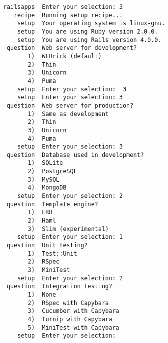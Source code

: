 \documentclass[bidi]{tufte-handout}
\begin{document}
\begin{verbatim}
   railsapps  Enter your selection: 3
      recipe  Running setup recipe...
       setup  Your operating system is linux-gnu.
       setup  You are using Ruby version 2.0.0.
       setup  You are using Rails version 4.0.0.
    question  Web server for development?
          1)  WEBrick (default)
          2)  Thin
          3)  Unicorn
          4)  Puma
       setup  Enter your selection:  3
       setup  Enter your selection: 3
    question  Web server for production?
          1)  Same as development
          2)  Thin
          3)  Unicorn
          4)  Puma
       setup  Enter your selection: 3
    question  Database used in development?
          1)  SQLite
          2)  PostgreSQL
          3)  MySQL
          4)  MongoDB
       setup  Enter your selection: 2
    question  Template engine?
          1)  ERB
          2)  Haml
          3)  Slim (experimental)
       setup  Enter your selection: 1
    question  Unit testing?
          1)  Test::Unit
          2)  RSpec
          3)  MiniTest
       setup  Enter your selection: 2
    question  Integration testing?
          1)  None
          2)  RSpec with Capybara
          3)  Cucumber with Capybara
          4)  Turnip with Capybara
          5)  MiniTest with Capybara
       setup  Enter your selection:


\end{verbatim}
\end{document}
